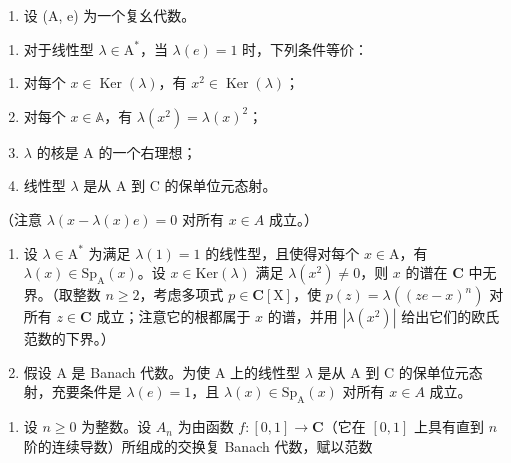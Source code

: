 
\begin{enumerate}
\def\labelenumi{\arabic{enumi})}
\tightlist
\item
  设 (A, e) 为一个复幺代数。
\end{enumerate}

\begin{enumerate}
\def\labelenumi{\alph{enumi})}
\tightlist
\item
  对于线性型 \(\lambda \in \mathrm{A}^*\)，当 \(\lambda(e) = 1\) 时，下列条件等价：
\end{enumerate}

\begin{enumerate}
\def\labelenumi{(\roman{enumi})}
\item
  对每个 \(x \in \operatorname{Ker}(\lambda)\)，有 \(x^2 \in \operatorname{Ker}(\lambda)\)；
\item
  对每个 \(x \in \mathbb{A}\)，有 \(\lambda(x^{2}) = \lambda(x)^{2}\)；
\item
  \(\lambda\) 的核是 A 的一个右理想；
\item
  线性型 \(\lambda\) 是从 A 到 C 的保单位元态射。
\end{enumerate}

（注意 \(\lambda(x - \lambda(x)e) = 0\) 对所有 \(x\in A\) 成立。）

\begin{enumerate}
\def\labelenumi{\alph{enumi})}
\setcounter{enumi}{1}
\item
  设 \(\lambda \in \mathrm{A}^*\) 为满足 \(\lambda(1) = 1\) 的线性型，且使得对每个 \(x \in \mathrm{A}\)，有 \(\lambda(x) \in \mathrm{Sp}_{\mathrm{A}}(x)\)。设 \(x \in \mathrm{Ker}(\lambda)\) 满足 \(\lambda(x^{2}) \neq 0\)，则 \(x\) 的谱在 \(\mathbf{C}\) 中无界。（取整数 \(n \geqslant 2\)，考虑多项式 \(p \in \mathbf{C}[\mathrm{X}]\)，使 \(p(z) = \lambda((ze - x)^{n})\) 对所有 \(z \in \mathbf{C}\) 成立；注意它的根都属于 \(x\) 的谱，并用 \(|\lambda(x^{2})|\) 给出它们的欧氏范数的下界。）
\item
  假设 A 是 Banach 代数。为使 A 上的线性型 \(\lambda\) 是从 A 到 C 的保单位元态射，充要条件是 \(\lambda(e)=1\)，且 \(\lambda(x)\in\mathrm{Sp}_{\mathrm{A}}(x)\) 对所有 \(x\in A\) 成立。
\end{enumerate}

\begin{enumerate}
\def\labelenumi{\arabic{enumi})}
\setcounter{enumi}{1}
\tightlist
\item
  设 \(n \geqslant 0\) 为整数。设 \(A_n\) 为由函数 \(f: [0,1] \to \mathbf{C}\)（它在 \([0,1]\) 上具有直到 \(n\) 阶的连续导数）所组成的交换复 Banach 代数，赋以范数
\end{enumerate}

